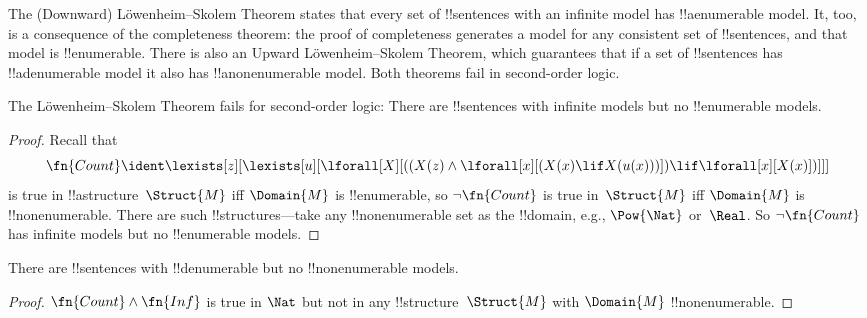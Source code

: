 \documentclass[../../../include/open-logic-section]{subfiles}
\begin{document}


\begin{explain}
The (Downward) L\"owenheim--Skolem Theorem states that every set of
!!{sentence}s with an infinite model has !!a{enumerable} model.  It,
too, is a consequence of the completeness theorem: the proof of
completeness generates a model for any consistent set of
!!{sentence}s, and that model is !!{enumerable}.  There is also an
Upward L\"owenheim--Skolem Theorem, which guarantees that if a set of
!!{sentence}s has !!a{denumerable} model it also has
!!a{nonenumerable} model.  Both theorems fail in second-order logic.
\end{explain}


\begin{thm}
 The L\"owenheim--Skolem Theorem fails for
second-order logic: There are !!{sentence}s with infinite models but
no !!{enumerable} models.
\end{thm}

\begin{proof}
Recall that 
\[
\fn{Count} \ident \lexists[z][\lexists[u][\lforall[X][((X(z) \land
      \lforall[x][(X(x) \lif X(u(x)))]) \lif \lforall[x][X(x)])]]]
\]
is true in !!a{structure}~$\Struct{M}$ iff $\Domain{M}$ is
!!{enumerable}, so $\lnot\fn{Count}$ is true in~$\Struct{M}$
iff $\Domain{M}$ is !!{nonenumerable}.  There are
such !!{structure}s---take any !!{nonenumerable} set as the
!!{domain}, e.g., $\Pow{\Nat}$ or~$\Real$. So $\lnot \fn{Count}$ 
has infinite models but no !!{enumerable} models.
\end{proof}

\begin{thm}
There are !!{sentence}s with !!{denumerable} but no
!!{nonenumerable} models.
\end{thm}

\begin{proof}
$\fn{Count} \land \fn{Inf}$ is true in $\Nat$ but not in any
  !!{structure}~$\Struct{M}$ with $\Domain{M}$ !!{nonenumerable}.
\end{proof}
\end{document}
